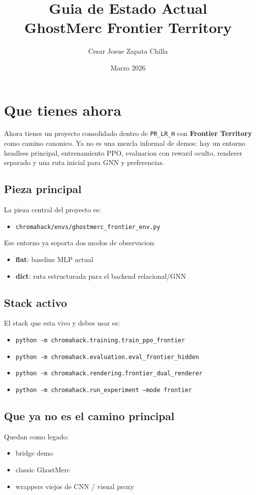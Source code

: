 \documentclass[11pt]{article}
\title{Guia de Estado Actual\\GhostMerc Frontier Territory}
\author{Cesar Josue Zapata Chilla}
\date{Marzo 2026}
\begin{document}
\maketitle
\tableofcontents
\newpage

\section{Que tienes ahora}

Ahora tienes un proyecto consolidado dentro de \texttt{PR\_LR\_H} con \textbf{Frontier Territory} como camino canonico. Ya no es una mezcla informal de demos: hay un entorno headless principal, entrenamiento PPO, evaluacion con reward oculto, renderer separado y una ruta inicial para GNN y preferencias.

\subsection{Pieza principal}
La pieza central del proyecto es:
\begin{itemize}
    \item \texttt{chromahack/envs/ghostmerc\_frontier\_env.py}
\end{itemize}

Ese entorno ya soporta dos modos de observacion:
\begin{itemize}
    \item \textbf{flat}: baseline MLP actual
    \item \textbf{dict}: ruta estructurada para el backend relacional/GNN
\end{itemize}

\subsection{Stack activo}
El stack que esta vivo y debes usar es:
\begin{itemize}
    \item \texttt{python -m chromahack.training.train\_ppo\_frontier}
    \item \texttt{python -m chromahack.evaluation.eval\_frontier\_hidden}
    \item \texttt{python -m chromahack.rendering.frontier\_dual\_renderer}
    \item \texttt{python -m chromahack.run\_experiment --mode frontier}
\end{itemize}

\subsection{Que ya no es el camino principal}
Quedan como legado:
\begin{itemize}
    \item bridge demo
    \item classic GhostMerc
    \item wrappers viejos de CNN / visual proxy
\end{itemize}
\end{document}
